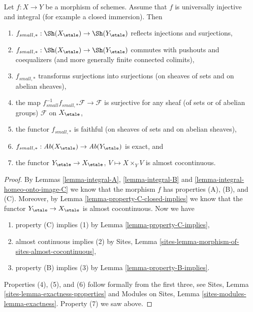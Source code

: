 \begin{lemma}
\label{lemma-integral-universally-injective}
Let $f : X \to Y$ be a morphism of schemes. Assume that $f$ is
universally injective and integral (for example a closed immersion).
Then
\begin{enumerate}
\item
$f_{small, *} :
\Sh(X_\etale)
\to
\Sh(Y_\etale)$
reflects injections and surjections,
\item
$f_{small, *} :
\Sh(X_\etale)
\to
\Sh(Y_\etale)$
commutes with pushouts and coequalizers (and more generally
finite connected colimits),
\item $f_{small, *}$ transforms surjections into surjections (on sheaves
of sets and on abelian sheaves),
\item the map
$f_{small}^{-1}f_{small, *}\mathcal{F} \to \mathcal{F}$
is surjective for any sheaf (of sets or of abelian groups)
$\mathcal{F}$ on $X_\etale$,
\item the functor $f_{small, *}$ is faithful (on sheaves of sets and
on abelian sheaves),
\item
$f_{small, *} :
\textit{Ab}(X_\etale)
\to
\textit{Ab}(Y_\etale)$
is exact, and
\item the functor
$Y_\etale \to X_\etale$, $V \mapsto X \times_Y V$ is
almost cocontinuous.
\end{enumerate}
\end{lemma}

\begin{proof}
By
Lemmas \ref{lemma-integral-A},
\ref{lemma-integral-B} and
\ref{lemma-integral-homeo-onto-image-C}
we know that the morphism $f$ has properties (A), (B), and (C).
Moreover, by
Lemma \ref{lemma-property-C-closed-implies}
we know that the functor $Y_\etale \to X_\etale$ is
almost cocontinuous. Now we have
\begin{enumerate}
\item property (C) implies (1) by
Lemma \ref{lemma-property-C-implies},
\item almost continuous implies (2) by
Sites, Lemma \ref{sites-lemma-morphism-of-sites-almost-cocontinuous},
\item property (B) implies (3) by
Lemma \ref{lemma-property-B-implies}.
\end{enumerate}
Properties (4), (5), and (6) follow formally from the first three, see
Sites, Lemma \ref{sites-lemma-exactness-properties}
and
Modules on Sites, Lemma \ref{sites-modules-lemma-exactness}.
Property (7) we saw above.
\end{proof}




